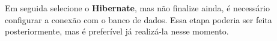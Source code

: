 \documentclass[12pt,a4paper]{article}
\begin{document}



Em seguida selecione o \textbf{Hibernate}, mas não finalize ainda, é necessário configurar a conexão com o banco de dados. Essa etapa poderia ser feita posteriormente, mas é preferível já realizá-la nesse momento.\\
\end{document}
